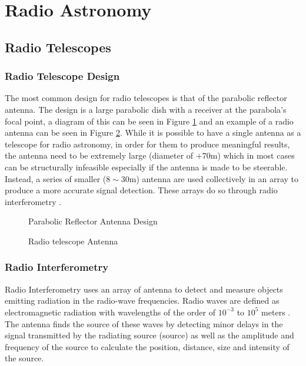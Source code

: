 \section{Radio Astronomy}\label{ra}
\subsection{Radio Telescopes}\label{ra:sec:rt}
%
\subsubsection{Radio Telescope Design}
The most common design for radio telescopes is that of the parabolic reflector antenna. The design is a large parabolic dish with a receiver at the parabola's focal point, a diagram of this can be seen in Figure \ref{ra:fig:para} and an example of a radio antenna can be seen in  Figure \ref{ra:fig:ant}. While it is possible to have a single antenna as a telescope for radio astronomy, in order for them to produce meaningful results, the antenna need to be extremely large (diameter of $+70$m) which in most cases can be structurally infeasible especially if the antenna is made to be steerable. Instead, a series of smaller ($8\sim30$m) antenna are used collectively in an array to produce a more accurate signal detection. These arrays do so through radio interferometry \citep{cheng2009radio}.
%
\begin{figure}[H]
	\centering
	\caption{Parabolic Reflector Antenna Design}
	\label{ra:fig:para}
\end{figure}
%
\begin{figure}[H]
	\centering
	\caption{Radio telescope Antenna}
	\label{ra:fig:ant}
\end{figure}
%
\subsubsection{Radio Interferometry}\label{ra:ssec:des}
Radio Interferometry uses an array of antenna to detect and measure objects emitting radiation in the radio-wave frequencies. Radio waves are defined as electromagnetic radiation with wavelengths of the order of $10^{-3}$ to $10^5$ meters \citep{cheng2009radio}. The antenna finds the source of these waves by detecting minor delays in the signal transmitted by the radiating source (source) as well as the amplitude and frequency of the source to calculate the position, distance, size and intensity of the source\citep{thompson2008interferometry}.
%
